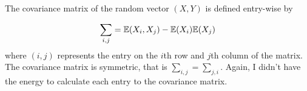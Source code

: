 
The covariance matrix of the random vector $ (X,Y)$ is defined entry-wise by 

\[
    \sum_{i,j} = \mathbb{E}(X_{i}, X_{j} ) - \mathbb{E}(X_{i} ) \mathbb{E}(X_{j} )
\] 
where $ (i,j)$ represents the entry on the $ i$th row and $ j$th column of the matrix. The
covariance matrix is symmetric, that is $ \sum_{i,j} = \sum_{j,i} $. Again, I didn't have the energy
to calculate each entry to the covariance matrix. 

